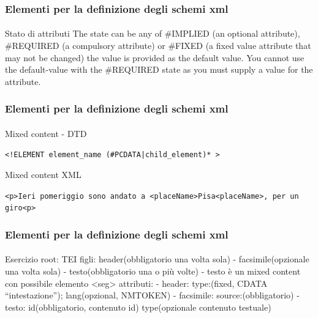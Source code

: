\begin{frame}
    \frametitle{Elementi per la definizione degli schemi xml}
    \framesubtitle{}
    \addtocounter{nframe}{1}

    \begin{block}{Stato di attributi}
     The state can be any of #IMPLIED (an optional attribute), #REQUIRED (a compulsory attribute) or #FIXED (a fixed value attribute that may not be changed) the value is provided as the default value. You cannot use the default-value with the #REQUIRED state as you must supply a value for the attribute.
    \end{block}
\end{frame}


\begin{frame}
    \frametitle{Elementi per la definizione degli schemi xml}
    \framesubtitle{}
    \addtocounter{nframe}{1}

    \begin{block}{Mixed content - DTD}
    \begin{center}\texttt{<!ELEMENT element_name (#PCDATA|child_element)* >}\end{center}
    \end{block}

    \begin{block}{Mixed content XML}
    \begin{center}\texttt{<p>Ieri pomeriggio sono andato a <placeName>Pisa<placeName>, per un giro<p>}\end{center}
    \end{block}

\end{frame}


\begin{frame}
    \frametitle{Elementi per la definizione degli schemi xml}
    \framesubtitle{}
    \addtocounter{nframe}{1}

    \begin{block}{Esercizio}
        root: TEI
         figli: header(obbligatorio una volta sola) - facsimile(opzionale una volta sola) - testo(obbligatorio una o più volte)
         - testo è un mixed content con possibile elemento <seg>
         attributi: 
         - header: type:(fixed, CDATA ``intestazione''); lang(opzional, NMTOKEN)
         - facsimile: source:(obbligatorio)
         - testo: id(obbligatorio, contenuto id) type(opzionale contenuto testuale)
    \end{block}
\end{frame}



